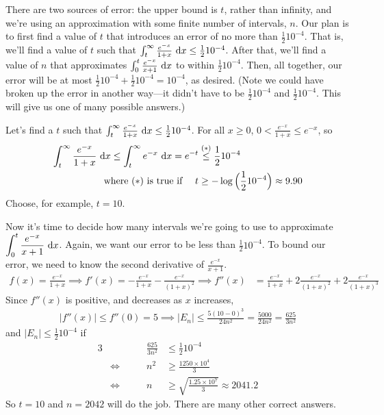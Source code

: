 \begin{solution}
There are two sources of error: the upper bound is $t$, rather than infinity, and we're using an approximation with some finite number of intervals, $n$. Our plan is to first find a value of $t$ that introduces an error of no more than $\frac{1}{2}10^{-4}$. That is, we'll find a value of $t$ such that $\int_t^\infty \frac{e^{-x}}{1+x}~\mathrm{d}x \leq \frac{1}{2}10^{-4}$. After that, we'll find a value of $n$ that approximates $\int_0^t \frac{e^{-x}}{x+1}~\mathrm{d}x$ to within $\frac{1}{2}10^{-4}$. Then, all together, our  error will be at most $\frac{1}{2}10^{-4} + \frac{1}{2}10^{-4} = 10^{-4}$, as desired. (Note we could have broken up the error in another way---it didn't have to be $\frac{1}{2}10^{-4}$ and $\frac{1}{2}10^{-4}$. This will give us one of many possible answers.)

Let's  find a $t$ such that
$\int_t^\infty  \frac{e^{-x}}{1+x}\ \dee{x}\le\frac{1}{2} 10^{-4}$.
For all $x\ge 0$,
$0<\frac{e^{-x}}{1+x}\le e^{-x}$, so
\begin{align*}
\int_t^\infty  \frac{e^{-x}}{1+x}\ \mathrm{d}x
\le \int_t^\infty e^{-x}\ \mathrm{d}x
=e^{-t}&\stackrel{(*)}{\le}\frac{1}{2} 10^{-4}\\
\hbox{where ($*$) is true if }\quad
t&\ge -\log\Big(\frac{1}{2} 10^{-4}\Big)\approx 9.90
\end{align*}
Choose, for example, $t=10$.

Now it's time to decide how many intervals we're going to use to approximate $\displaystyle\int_0^t \frac{e^{-x}}{x+1}~\mathrm{d}x$. Again, we want our error to be less than $\frac{1}{2}10^{-4}$. To bound our error, we need to know the second derivative of $\frac{e^{-x}}{x+1}$.
\begin{align*}
f(x)=\frac{e^{-x}}{1+x}
\implies f'(x)=-\frac{e^{-x}}{1+x}-\frac{e^{-x}}{(1+x)^2}
\implies f''(x)&=\frac{e^{-x}}{1+x}+2\frac{e^{-x}}{(1+x)^2}
+2\frac{e^{-x}}{(1+x)^3}
\end{align*}
Since $f''(x)$ is positive, and decreases as $x$ increases,
\begin{align*}
|f''(x)|\le f''(0) = 5
\implies |E_n|\le\frac{5(10-0)^3}{24n^2}=\frac{5000}{24n^2}
=\frac{625}{3n^2}
\end{align*}
and $|E_n|\le \frac{1}{2} 10^{-4}$ if
\begin{alignat*}{3}
&&\frac{625}{3n^2}&\le \frac{1}{2} 10^{-4}\\
&\iff\qquad &
n^2&\ge \frac{1250\times 10^4}{3}\\
&\iff\quad &n&\ge \sqrt{\frac{1.25\times 10^7}{3}}
\approx 2041.2
\end{alignat*}
So $t=10$ and $n= 2042$ will do the job.
There are many other correct answers.
\end{solution}


